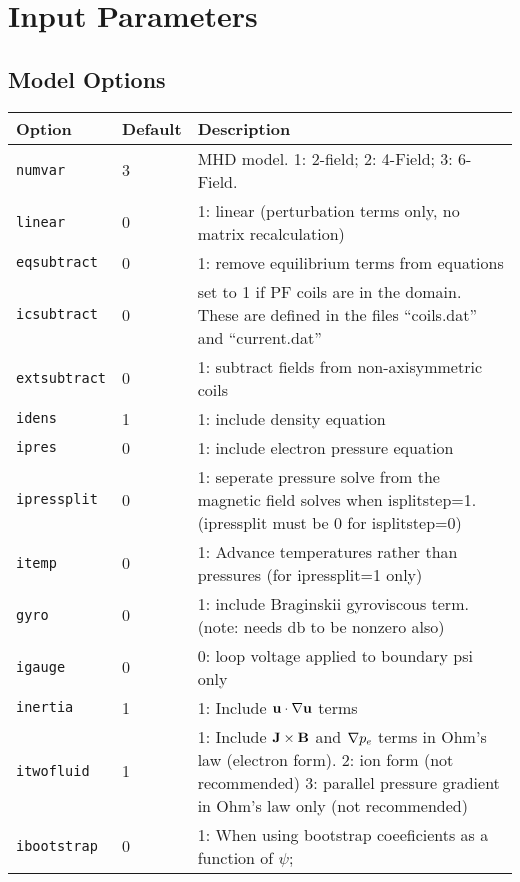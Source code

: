 \section{Input Parameters}
\label{sec:input_parameters}
\subsection{Model Options}

\begin{tabular}{llp{4in}}
  \textbf{Option}&\textbf{Default}&\textbf{Description}\\
  \hline
  \texttt{numvar} & 3   & MHD model. 1: 2-field;  2: 4-Field;  3: 6-Field.\\
  \texttt{linear} & 0   & 1: linear (perturbation terms only, no matrix
  recalculation)\\
  \texttt{eqsubtract}& 0& 1: remove equilibrium terms from equations\\
  \texttt{icsubtract}& 0& set to 1 if PF coils are in the domain.  These are
  defined in the files ``coils.dat'' and ``current.dat''\\
  \texttt{extsubtract} & 0 & 1: subtract fields from non-axisymmetric coils \\
  \texttt{idens}  & 1   & 1: include density equation\\
  \texttt{ipres}  & 0   & 1: include electron pressure equation\\
  \texttt{ipressplit} & 0 & 1: seperate pressure solve from the magnetic field
  solves when isplitstep=1.  (ipressplit must be 0 for isplitstep=0) \\
  \texttt{itemp} & 0 & 1: Advance temperatures rather than pressures (for ipressplit=1 only) \\
  \texttt{gyro}   & 0   & 1: include Braginskii gyroviscous term.  (note:
  needs db to be nonzero also) \\
  \texttt{igauge} & 0   & 0: loop voltage applied to boundary psi only \\
  \texttt{inertia} & 1  & 1: Include $\mathbf{u} \cdot \nabla \mathbf{u}$ terms\\
  \texttt{itwofluid}& 1 & 1: Include $\mathbf{J}\times\mathbf{B}$ and
  $\nabla p_e$ terms in Ohm's law (electron form).  2: ion form (not
  recommended)  3: parallel pressure gradient in Ohm's law only
  (not recommended) \\
  \texttt{ibootstrap} & 0 & 1: When using bootstrap coeeficients as a function of $\psi$; \\

\end{tabular}
